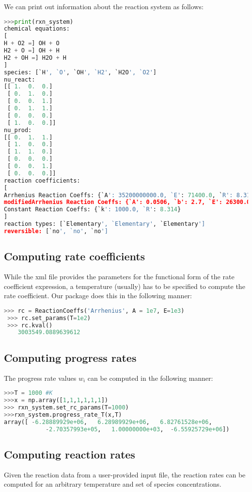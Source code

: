 \documentclass[12pt]{article}
\begin{document}
We can print out information about the reaction system as follows:
\begin{lstlisting}[language = Python, basicstyle = \ttfamily,columns = fullflexible, showstringspaces = False]
>>>print(rxn_system)
chemical equations:
[
H + O2 =] OH + O
H2 + O =] OH + H
H2 + OH =] H2O + H
]
species: [`H', `O', `OH', `H2', `H2O', `O2']
nu_react:
[[ 1.  0.  0.]
 [ 0.  1.  0.]
 [ 0.  0.  1.]
 [ 0.  1.  1.]
 [ 0.  0.  0.]
 [ 1.  0.  0.]]
nu_prod:
[[ 0.  1.  1.]
 [ 1.  0.  0.]
 [ 1.  1.  0.]
 [ 0.  0.  0.]
 [ 0.  0.  1.]
 [ 0.  0.  0.]]
reaction coefficients:
[
Arrhenius Reaction Coeffs: {`A': 35200000000.0, `E': 71400.0, `R': 8.314}
modifiedArrhenius Reaction Coeffs: {`A': 0.0506, `b': 2.7, `E': 26300.0, `R': 8.314}
Constant Reaction Coeffs: {`k': 1000.0, `R': 8.314}
]
reaction types: [`Elementary', `Elementary', `Elementary']
reversible: [`no', `no', `no']
\end{lstlisting}

\subsection{Computing rate coefficients}
While the xml file provides the parameters for the functional form of the rate coefficient expression, a temperature (usually) has to be specified to compute the rate coefficient. Our package does this in the following manner:

\begin{lstlisting}[language = Python, basicstyle = \ttfamily,columns = fullflexible, showstringspaces = False]
 >>> rc = ReactionCoeffs('Arrhenius', A = 1e7, E=1e3)
 >>> rc.set_params(T=1e2)
 >>> rc.kval()
    3003549.0889639612
\end{lstlisting}


\subsection{Computing progress rates}
The progress rate values $w_i$ can be computed in the following manner:
\begin{lstlisting}[language = Python, basicstyle = \ttfamily,columns = fullflexible, showstringspaces = False]
>>>T = 1000 #K
>>>x = np.array([1,1,1,1,1,1])
>>> rxn_system.set_rc_params(T=1000)
>>>rxn_system.progress_rate_T(x,T)
array([ -6.28889929e+06,   6.28989929e+06,   6.82761528e+06,
            -2.70357993e+05,   1.00000000e+03,  -6.55925729e+06])
\end{lstlisting}


\subsection{Computing reaction rates}
Given the reaction data from a user-provided input file, the reaction rates can be computed for an arbitrary temperature and set of species concentrations.
\end{document}
